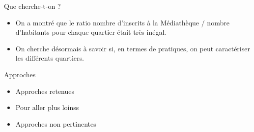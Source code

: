 \documentclass{beamer}
\begin{document}
\begin{frame}{Que cherche-t-on ?}
	\begin{itemize}
		\item On a montré que le ratio nombre d'inscrits à la Médiathèque / nombre d'habitants pour chaque quartier était très inégal.
		\item On cherche désormais à savoir si, en termes de pratiques, on peut caractériser les différents quartiers.
	\end{itemize}
\end{frame}

\begin{frame}{Approches}
	\begin{itemize}
		\item Approches retenues
		\item Pour aller plus loinss
		\item Approches non pertinentes
	\end{itemize}
\end{frame}
\end{document}
